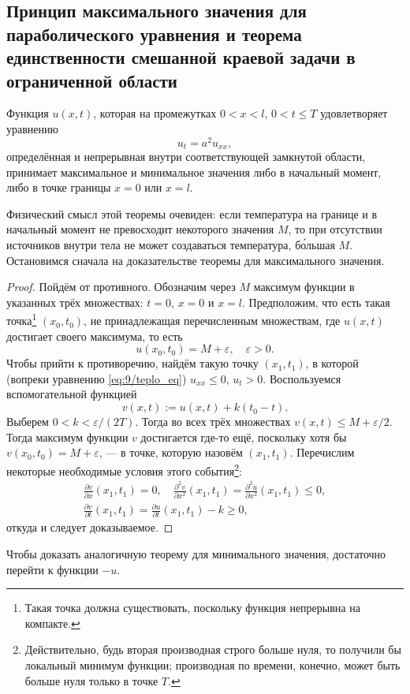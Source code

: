 \subsection{Принцип максимального значения для параболического уравнения и теорема единственности смешанной краевой задачи в ограниченной области}
\begin{theorem} Функция $ u(x, t) $, которая на промежутках $ 0 < x < l $, $ 0 <
  t \leqslant T$ удовлетворяет уравнению
\begin{equation}
  \label{eq:9/teplo_eq}
  u_t = a^2u_{xx},
\end{equation}
определённая и непрерывная внутри соответствующей замкнутой области, принимает максимальное и минимальное значения либо в начальный момент, либо в
точке границы $ x = 0 $ или $ x = l $.\end{theorem}

Физический смысл этой теоремы очевиден: если
температура на
границе и в начальный момент не превосходит некоторого значения
$ M $, то при отсутствии источников внутри тела не может создаваться
температура, б\'{о}льшая $ M $. Остановимся сначала на доказательстве
теоремы для максимального значения.

\begin{proof}Пойдём от противного. Обозначим через $ M $ максимум функции в указанных трёх
множествах: $ t = 0 $, $ x = 0 $ и $ x = l $. Предположим, что есть такая
точка\footnote{Такая точка должна существовать, поскольку функция непрерывна на компакте.}
$ (x_0, t_0) $, не принадлежащая перечисленным множествам, где $ u(x, t) $
достигает своего максимума, то есть 
\[
    u(x_0, t_0) = M + \varepsilon, \quad \varepsilon > 0.
\]
Чтобы прийти к противоречию, найдём такую точку $ (x_1, t_1) $, в которой
(вопреки уравнению \eqref{eq:9/teplo_eq}) $ u_{xx} \leqslant 0 $, $ u_t > 0 $.
Воспользуемся вспомогательной функцией  
\[
    v(x, t) := u(x, t) + k(t_0 - t).
\]
Выберем $ 0 < k < \varepsilon/(2T) $. Тогда во всех трёх множествах $
v(x, t) \leqslant M + \varepsilon/2 $. Тогда максимум функции $ v $ достигается
где-то ещё, поскольку хотя бы $ v(x_0, t_0) = M + \varepsilon $, --- в точке,
которую назовём $ (x_1, t_1) $.
Перечислим некоторые необходимые условия этого события\footnote{Действительно,
  будь вторая производная строго больше нуля, то получили бы локальный минимум функции; производная по времени, конечно, может быть больше нуля только в точке $ T $.}: 
\begin{gather*}
    \frac{\partial v}{\partial x}(x_1, t_1) = 0, \quad \frac{\partial^2
    v}{\partial x^2}(x_1, t_1) = \frac{\partial^2 u}{\partial x^2}(x_1, t_1) \leqslant 0,\\
    \frac{\partial v}{\partial t}(x_1, t_1) = \frac{\partial u}{\partial t}(x_1,
    t_1) - k \geqslant 0,
\end{gather*}
откуда и следует доказываемое.
\end{proof}
Чтобы доказать аналогичную теорему для минимального значения, достаточно перейти
к функции $ -u $.

